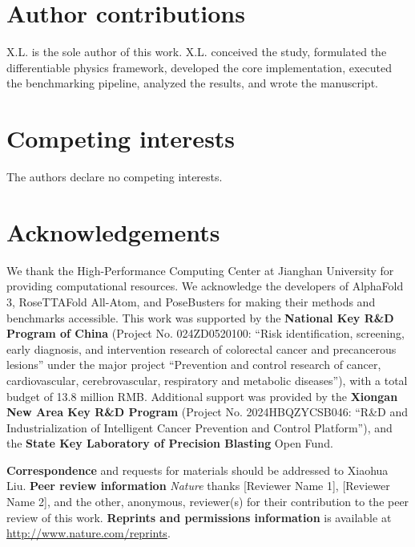 \documentclass[twocolumn,10pt]{article}
\begin{document}
\section*{Author contributions}
X.L. is the sole author of this work. X.L. conceived the study, formulated the differentiable physics framework, developed the core implementation, executed the benchmarking pipeline, analyzed the results, and wrote the manuscript.

\section*{Competing interests}
The authors declare no competing interests.

\section*{Acknowledgements}
We thank the High-Performance Computing Center at Jianghan University for providing computational resources.
We acknowledge the developers of AlphaFold 3, RoseTTAFold All-Atom, and PoseBusters for making their methods and benchmarks accessible.
This work was supported by the \textbf{National Key R\&D Program of China} (Project No. 024ZD0520100: ``Risk identification, screening, early diagnosis, and intervention research of colorectal cancer and precancerous lesions'' under the major project ``Prevention and control research of cancer, cardiovascular, cerebrovascular, respiratory and metabolic diseases''), with a total budget of 13.8 million RMB.
Additional support was provided by the \textbf{Xiongan New Area Key R\&D Program} (Project No. 2024HBQZYCSB046: ``R\&D and Industrialization of Intelligent Cancer Prevention and Control Platform''), and the \textbf{State Key Laboratory of Precision Blasting} Open Fund.

\textbf{Correspondence} and requests for materials should be addressed to Xiaohua Liu.
\textbf{Peer review information} \textit{Nature} thanks [Reviewer Name 1], [Reviewer Name 2], and the other, anonymous, reviewer(s) for their contribution to the peer review of this work.
\textbf{Reprints and permissions information} is available at \url{http://www.nature.com/reprints}.




\clearpage

\clearpage
\onecolumn
\end{document}
